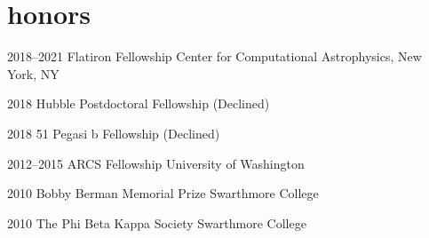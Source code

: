 \documentclass[]{luger-cv} %
\begin{document}



\section{honors}

\begin{entrylist}

\entry
{2018--2021}
{Flatiron Fellowship}
{Center for Computational Astrophysics, New York, NY}
{%
\vspace*{-0.75em}
}

\entry
{2018}
{Hubble Postdoctoral Fellowship}
{(Declined)}
{%
\vspace*{-0.75em}
}


\entry
{2018}
{51 Pegasi b Fellowship}
{(Declined)}
{%
\vspace*{-0.75em}
}


\entry
{2012--2015}
{ARCS Fellowship}
{University of Washington}
{%
\vspace*{-0.75em}
}


\entry
{2010}
{Bobby Berman Memorial Prize}
{Swarthmore College}
{%
\vspace*{-0.75em}
}


\ifdefined \onepage \else
\entry
{2010}
{The Phi Beta Kappa Society}
{Swarthmore College}
{}
\fi


\end{entrylist}

\end{document}
